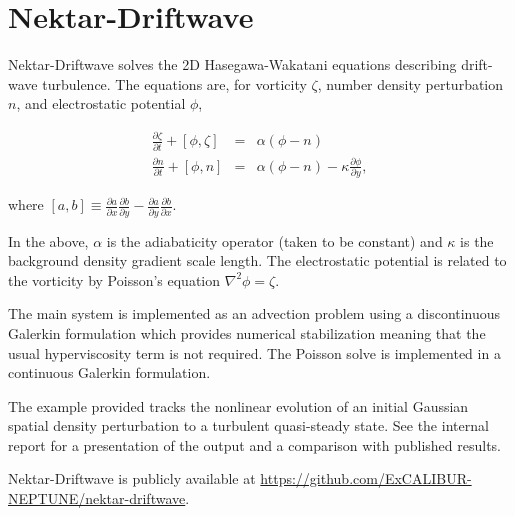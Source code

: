 \section{Nektar-Driftwave}
Nektar-Driftwave solves the 2D Hasegawa-Wakatani equations describing drift-wave turbulence.  The equations are, for
vorticity $\zeta$, number density perturbation $n$, and electrostatic potential $\phi$,

\begin{eqnarray}
\frac{\partial \zeta}{\partial t}+[\phi, \zeta] &=& \alpha (\phi-n)\\
\frac{\partial n}{\partial t} +[\phi,n] &=& \alpha (\phi-n)-\kappa \frac{\partial \phi}{\partial y},
\end{eqnarray}

where $[a,b] \equiv \frac{\partial a}{\partial x} \frac{\partial b}{\partial y} - \frac{\partial a}{\partial y}
 \frac{\partial b}{\partial x}$.

In the above, $\alpha$ is the adiabaticity operator (taken to be constant) and $\kappa$ is the background density 
gradient scale length.  The electrostatic potential is related to the vorticity by Poisson's equation $\nabla^2 \phi 
= \zeta$.

The main system is implemented as an advection problem using a discontinuous Galerkin formulation which provides numerical
stabilization meaning that the usual hyperviscosity term is not required.  The Poisson solve is implemented in a 
continuous Galerkin formulation. 

The example provided tracks the nonlinear evolution of an initial Gaussian spatial density perturbation to a
 turbulent quasi-steady state.  See the internal report \cite{y3re222} for a presentation of the output and a 
comparison with published results.

Nektar-Driftwave is publicly available at \url{https://github.com/ExCALIBUR-NEPTUNE/nektar-driftwave}.  
